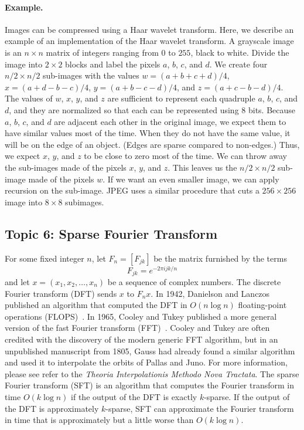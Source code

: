 \documentclass[11pt]{article}
\begin{document}
\paragraph{Example.} Images can be compressed using a Haar wavelet transform. Here, we describe an example of an implementation of the Haar wavelet transform. A grayscale image is an $n \times n$ matrix of integers ranging from $0$ to $255$, black to white. Divide the image into $2 \times 2$ blocks and label the pixels $a$, $b$, $c$, and $d$. We create four $n/2 \times n/2$ sub-images with the values $w = (a + b + c + d)/4$, $x = (a + d - b - c)/4$, $y = (a + b - c - d)/4$, and $z = (a + c - b - d)/4$. The values of $w$, $x$, $y$, and $z$ are sufficient to represent each quadruple $a$, $b$, $c$, and $d$, and they are normalized so that each can be represented using $8$ bits. Because $a$, $b$, $c$, and $d$ are adjacent each other in the original image, we expect them to have similar values most of the time. When they do not have the same value, it will be on the edge of an object. (Edges are sparse compared to non-edges.) Thus, we expect $x$, $y$, and $z$ to be close to zero most of the time. We can throw away the sub-images made of the pixels $x$, $y$, and $z$. This leaves us the $n/2 \times n/2$ sub-image made of the pixels $w$. If we want an even smaller image, we can apply recursion on the sub-image. JPEG uses a similar procedure that cuts a $256 \times 256$ image into $8 \times 8$ subimages.

\subsection*{Topic 6: Sparse Fourier Transform}
For some fixed integer $n$, let $F_n = [F_{jk}]$ be the matrix furnished by the terms
\[
    F_{jk} = e^{-2\pi{}ijk/n}
\]
and let $x = (x_1, x_2, \ldots, x_n)$ be a sequence of complex numbers. The discrete Fourier transform (DFT) sends $x$ to $F_nx$. In 1942, Danielson and Lanczos published an algorithm that computed the DFT in $O(n\log{n})$ floating-point operations (FLOPS)~\cite{DanielsonL42}. In 1965, Cooley and Tukey published a more general version of the fast Fourier transform (FFT)~\cite{CooleyT65}. Cooley and Tukey are often credited with the discovery of the modern generic FFT algorithm, but in an unpublished manuscript from 1805, Gauss had already found a similar algorithm and used it to interpolate the orbits of Pallas and Juno. For more information, please see refer to the \textit{Theoria Interpolationis Methodo Nova Tractata}. The sparse Fourier transform (SFT) is an algorithm that computes the Fourier transform in time $O(k\log{n})$ if the output of the DFT is exactly $k$-sparse. If the output of the DFT is approximately $k$-sparse, SFT can approximate the Fourier transform in time that is approximately but a little worse than $O(k\log{n})$.
\end{document}
